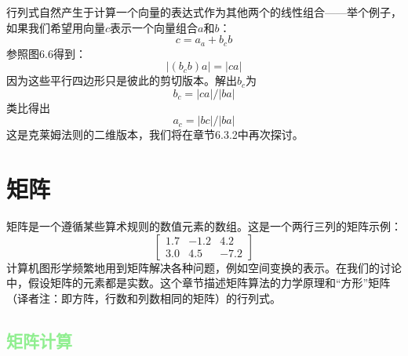 \documentclass[lang=cn,12pt]{elegantbook}
\begin{document}
行列式自然产生于计算一个向量的表达式作为其他两个的线性组合——举个例子，如果我们希望用向量$c$表示一个向量组合$a$和$b$：$$c = a_a + b_cb$$参照图6.6得到：$$|(b_cb)a| = |ca|$$因为这些平行四边形只是彼此的剪切版本。解出$b_c$为$$b_c = |ca|/|ba|$$类比得出$$a_c = |bc|/|ba|$$这是克莱姆法则的二维版本，我们将在章节6.3.2中再次探讨。

\section{矩阵}

矩阵是一个遵循某些算术规则的数值元素的数组。这是一个两行三列的矩阵示例：
$$
  \left[\begin{array}{rrr}
      1.7 & -1.2 & 4.2  \\
      3.0 & 4.5  & -7.2
    \end{array}\right]
$$
计算机图形学频繁地用到矩阵解决各种问题，例如空间变换的表示。在我们的讨论中，假设矩阵的元素都是实数。这个章节描述矩阵算法的力学原理和“方形”矩阵（译者注：即方阵，行数和列数相同的矩阵）的行列式。

\subsection{\textcolor{lightgreen}{矩阵计算}}
\end{document}
